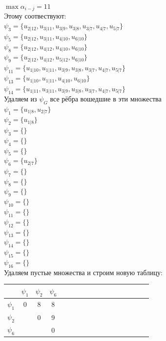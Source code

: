 \documentclass[12pt,a4paper]{report}
\begin{document}
\hfill\break
$\max \alpha_{i-j}=11$\\
Этому соотвествуют:\\
$\psi_{3} = \{u_{2 | 12},u_{3 | 11},u_{3 | 9},u_{3 | 8},u_{3 | 7},u_{4 | 7},u_{5 | 7}\}$ \\
$\psi_{5} = \{u_{2 | 12},u_{3 | 11},u_{4 | 10},u_{6 | 10}\}$ \\
$\psi_{8} = \{u_{2 | 12},u_{4 | 12},u_{4 | 10},u_{6 | 10}\}$ \\
$\psi_{9} = \{u_{2 | 12},u_{4 | 12},u_{5 | 12},u_{6 | 10}\}$ \\
$\psi_{11} = \{u_{1 | 10},u_{1 | 11},u_{3 | 9},u_{3 | 8},u_{3 | 7},u_{4 | 7},u_{5 | 7}\}$ \\
$\psi_{13} = \{u_{1 | 10},u_{1 | 11},u_{4 | 10},u_{6 | 10}\}$ \\
$\psi_{14} = \{u_{1 | 11},u_{3 | 11},u_{3 | 9},u_{3 | 8},u_{3 | 7},u_{4 | 7},u_{5 | 7}\}$ \\
Удаляем из $\psi_G$ все рёбра вошедшие в эти множества\\
$\psi_{1} = \{u_{1 | 8},u_{2 | 7}\}$ \\
$\psi_{2} = \{u_{1 | 8}\}$ \\
$\psi_{3} = \{\}$ \\
$\psi_{4} = \{\}$ \\
$\psi_{5} = \{\}$ \\
$\psi_{6} = \{u_{2 | 7}\}$ \\
$\psi_{7} = \{\}$ \\
$\psi_{8} = \{\}$ \\
$\psi_{9} = \{\}$ \\
$\psi_{10} = \{\}$ \\
$\psi_{11} = \{\}$ \\
$\psi_{12} = \{\}$ \\
$\psi_{13} = \{\}$ \\
$\psi_{14} = \{\}$ \\
$\psi_{15} = \{\}$ \\
$\psi_{16} = \{\}$ \\
Удаляем пустые множества и строим новую таблицу:\\
\hfill\break
\begin{tabular}{|c|c|c|c|c|c|c|c|c|c|c|c|c|c|c|c|c|}
    \hline
    & $\psi_{1}$ & $\psi_{2}$ & $\psi_{6}$ \\
    \hline
    $\psi_{1}$ & 0 & 8 & 8 \\
    \hline
    $\psi_{2}$ &   & 0 & 9 \\
    \hline
    $\psi_{6}$ &   &   & 0 \\
    \hline
\end{tabular}\\
\end{document}

